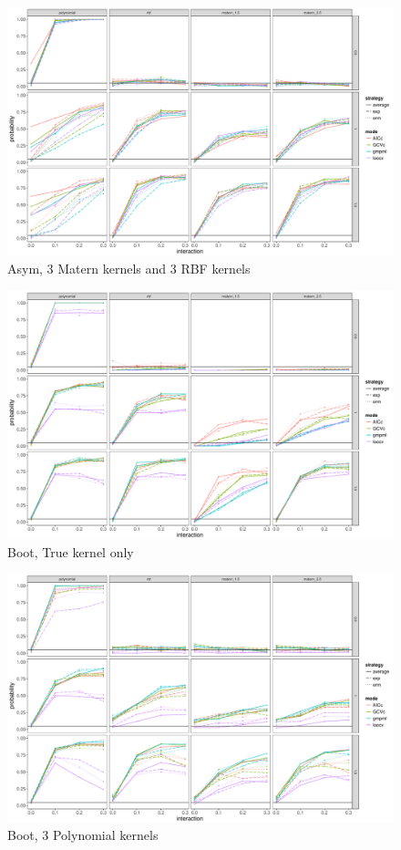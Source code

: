 \documentclass[article]{jss}
\begin{document}
\begin{figure}
\begin{center}
\includegraphics[width=0.9\columnwidth]{A5} 
\caption{Asym, 3 Matern kernels and 3 RBF kernels}
\label{fig:res}
\end{center}
\end{figure}

\begin{figure}
\begin{center}
\includegraphics[width=0.9\columnwidth]{B1} 
\caption{Boot, True kernel only}
\label{fig:res}
\end{center}
\end{figure}

\begin{figure}
\begin{center}
\includegraphics[width=0.9\columnwidth]{B2} 
\caption{Boot, 3 Polynomial kernels}
\label{fig:res}
\end{center}
\end{figure}
\end{document}
